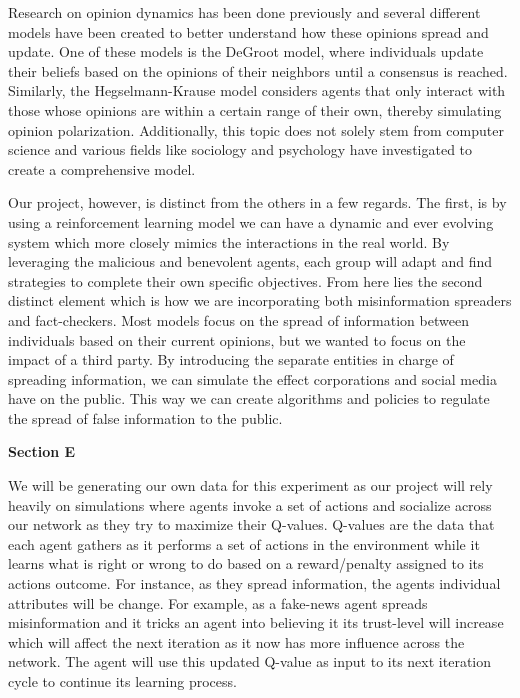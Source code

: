 \documentclass[12pt,twoside]{article}
\begin{document}
Research on opinion dynamics has been done previously and several different models have been created to better understand how these opinions spread and update. One of these models is the DeGroot model, where individuals update their beliefs based on the opinions of their neighbors until a consensus is reached. Similarly, the Hegselmann-Krause model considers agents that only interact with those whose opinions are within a certain range of their own, thereby simulating opinion polarization. Additionally, this topic does not solely stem from computer science and various fields like sociology and psychology have investigated to create a comprehensive model.

Our project, however, is distinct from the others in a few regards. The first, is by using a reinforcement learning model we can have a dynamic and ever evolving system which more closely mimics the interactions in the real world. By leveraging the malicious and benevolent agents, each group will adapt and find strategies to complete their own specific objectives. From here lies the second distinct element which is how we are incorporating both misinformation spreaders and fact-checkers. Most models focus on the spread of information between individuals based on their current opinions, but we wanted to focus on the impact of a third party. By introducing the separate entities in charge of spreading information, we can simulate the effect corporations and social media have on the public. This way we can create algorithms and policies to regulate the spread of false information to the public.

\textbf{Section E}

We will be generating our own data for this experiment as our project will rely heavily on simulations where agents invoke a set of actions and socialize across our network as they try to maximize their Q-values. Q-values are the data that each agent gathers as it performs a set of actions in the environment while it learns what is right or wrong to do based on a reward/penalty assigned to its actions outcome. For instance, as they spread information, the agents individual attributes will be change. For example, as a fake-news agent spreads misinformation and it tricks an agent into believing it its trust-level will increase which will affect the next iteration as it now has more influence across the network. The agent will use this updated Q-value as input to its next iteration cycle to continue its learning process.
\end{document}
